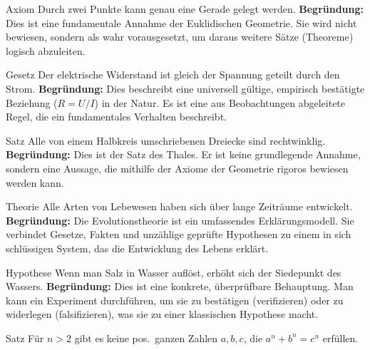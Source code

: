 \documentclass[ngerman]{scrreprt}
\newenvironment{loesungbox}[1]
  {\needspace{5\baselineskip}\begin{loesungboxstyle}[frametitle={#1}]}
  {\end{loesungboxstyle}}
\begin{document}
\begin{loesungbox}{Lösung zu \Cref{aufg:die_physik}}
\begin{tcbraster}[raster columns=2, raster equal height=rows]
    \begin{solutiontermbox}{Axiom}
        Durch zwei Punkte kann genau eine Gerade gelegt werden.
        \tcblower
        \textbf{Begründung:} Dies ist eine fundamentale Annahme der Euklidischen Geometrie. Sie wird nicht bewiesen, sondern als wahr vorausgesetzt, um daraus weitere Sätze (Theoreme) logisch abzuleiten.
    \end{solutiontermbox}
    \begin{solutiontermbox}{Gesetz}
        Der elektrische Widerstand ist gleich der Spannung geteilt durch den Strom.
        \tcblower
        \textbf{Begründung:} Dies beschreibt eine universell gültige, empirisch bestätigte Beziehung ($R=U/I$) in der Natur. Es ist eine aus Beobachtungen abgeleitete Regel, die ein fundamentales Verhalten beschreibt.
    \end{solutiontermbox}
    \begin{solutiontermbox}{Satz}
        Alle von einem Halbkreis umschriebenen Dreiecke sind rechtwinklig.
        \tcblower
        \textbf{Begründung:} Dies ist der Satz des Thales. Er ist keine grundlegende Annahme, sondern eine Aussage, die mithilfe der Axiome der Geometrie rigoros bewiesen werden kann.
    \end{solutiontermbox}
    \begin{solutiontermbox}{Theorie}
        Alle Arten von Lebewesen haben sich über lange Zeiträume entwickelt.
        \tcblower
        \textbf{Begründung:} Die Evolutionstheorie ist ein umfassendes Erklärungsmodell. Sie verbindet Gesetze, Fakten und unzählige geprüfte Hypothesen zu einem in sich schlüssigen System, das die Entwicklung des Lebens erklärt.
    \end{solutiontermbox}
    \begin{solutiontermbox}{Hypothese}
        Wenn man Salz in Wasser auflöst, erhöht sich der Siedepunkt des Wassers.
        \tcblower
        \textbf{Begründung:} Dies ist eine konkrete, überprüfbare Behauptung. Man kann ein Experiment durchführen, um sie zu bestätigen (verifizieren) oder zu widerlegen (falsifizieren), was sie zu einer klassischen Hypothese macht.
    \end{solutiontermbox}
    \begin{solutiontermbox}{Satz}
        Für $n>2$ gibt es keine pos.\ ganzen Zahlen $a, b, c$, die $a^n + b^n = c^n$ erfüllen.

\end{solutiontermbox}
\end{tcbraster}
\end{loesungbox}
\end{document}
